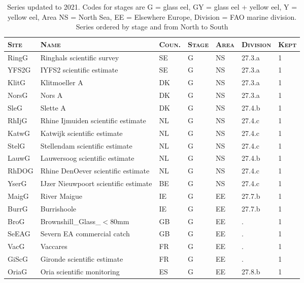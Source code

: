 \begin{table}[htbp]
\centering
\caption{Series updated to 2021. Codes for stages are G = glass eel, GY = glass eel + yellow eel, Y = yellow eel, Area NS = North Sea, EE = Elsewhere Europe, Division = FAO marine division. Series ordered by stage and from North to South} 
\label{table_seriesCY}
\begin{tabularx}{\textwidth}{p{1.3cm}p{6.5cm}p{1cm}p{1cm}p{1cm}p{1cm}p{1.4cm}}
  \hline
\scshape{Site} & \scshape{Name} & \scshape{Coun.} & \scshape{Stage} & \scshape{Area} & \scshape{Division} & \scshape{Kept} \\ 
  \hline
RingG & Ringhals scientific survey & SE & G & NS & 27.3.a &   1 \\ 
  YFS2G & IYFS2 scientific estimate & SE & G & NS & 27.3.a &   1 \\ 
  KlitG & Klitmoeller A & DK & G & NS & 27.3.a &   1 \\ 
  NorsG & Nors A & DK & G & NS & 27.3.a &   1 \\ 
  SleG & Slette A & DK & G & NS & 27.4.b &   1 \\ 
  RhIjG & Rhine Ijmuiden scientific estimate & NL & G & NS & 27.4.c &   1 \\ 
  KatwG & Katwijk scientific estimate & NL & G & NS & 27.4.c &   1 \\ 
  StelG & Stellendam scientific estimate & NL & G & NS & 27.4.c &   1 \\ 
  LauwG & Lauwersoog scientific estimate & NL & G & NS & 27.4.b &   1 \\ 
  RhDOG & Rhine DenOever scientific estimate & NL & G & NS & 27.4.c &   1 \\ 
  YserG & IJzer Nieuwpoort scientific estimate & BE & G & NS & 27.4.c &   1 \\ 
  MaigG & River Maigue & IE & G & EE & 27.7.b &   1 \\ 
  BurrG & Burrishoole & IE & G & EE & 27.7.b &   1 \\ 
  BroG & Brownshill\_Glass\_$<$80mm & GB & G & EE & . &   1 \\ 
  SeEAG & Severn EA commercial catch & GB & G & EE & . &   1 \\ 
  VacG & Vaccares & FR & G & EE & . &   1 \\ 
  GiScG & Gironde scientific estimate & FR & G & EE & . &   1 \\ 
  OriaG & Oria scientific monitoring & ES & G & EE & 27.8.b &   1 \\ 

\end{tabularx}
\end{table}
